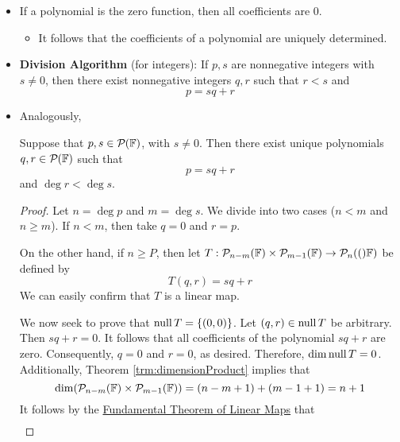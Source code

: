 \documentclass[../main.tex]{subfiles}
\begin{document}
\begin{itemize}
\begin{theorem}
\begin{description}
        \end{description}
    \end{theorem}
    \item If a polynomial is the zero function, then all coefficients are 0.
    \begin{itemize}
        \item It follows that the coefficients of a polynomial are uniquely determined.
    \end{itemize}
    \item \textbf{Division Algorithm} (for integers): If $p,s$ are nonnegative integers with $s\neq 0$, then there exist nonnegative integers $q,r$ such that $r<s$ and
    \begin{equation*}
        p = sq+r
    \end{equation*}
    \item Analogously,
    \begin{theorem}
        Suppose that $p,s\in\pol{\F}$, with $s\neq 0$. Then there exist unique polynomials $q,r\in\pol{\F}$ such that
        \begin{equation*}
            p = sq+r
        \end{equation*}
        and $\deg r<\deg s$.
        \begin{proof}
            Let $n=\deg p$ and $m=\deg s$. We divide into two cases ($n<m$ and $n\geq m$). If $n<m$, then take $q=0$ and $r=p$.\par\smallskip
            On the other hand, if $n\geq P$, then let $T:\pol[n-m]{\F}\times\pol[m-1]{\F}\to\pol[n](\F)$ be defined by
            \begin{equation*}
                T(q,r) = sq+r
            \end{equation*}
            We can easily confirm that $T$ is a linear map.\par
            We now seek to prove that $\nul T=\{(0,0)\}$. Let $(q,r)\in\nul T$ be arbitrary. Then $sq+r=0$. It follows that all coefficients of the polynomial $sq+r$ are zero. Consequently, $q=0$ and $r=0$, as desired. Therefore, $\dim\nul T=0$. Additionally, Theorem \ref{trm:dimensionProduct} implies that
            \begin{equation*}
                \dim(\pol[n-m]{\F}\times\pol[m-1]{\F}) = (n-m+1)+(m-1+1) = n+1
            \end{equation*}
            It follows by the \hyperref[trm:fundamentalTheoremLinearMaps]{Fundamental Theorem of Linear Maps} that
            \begin{align*}

\end{align*}
\end{proof}
\end{theorem}
\end{itemize}
\end{document}
